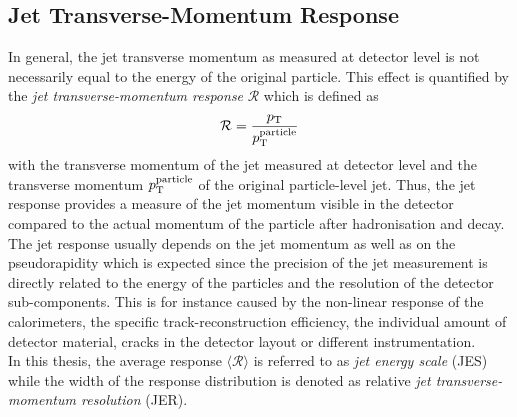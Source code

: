 \subsection{Jet Transverse-Momentum Response}
\label{subsec:jets_response}
In general, the jet transverse momentum as measured at detector level is not necessarily equal to the energy of the original particle. This effect is quantified by the \textit{jet transverse-momentum response} $\mathcal{R}$ which is defined as 
\begin{equation}
  \mathcal{R} = \frac{p_{\text{T}}}{p_{\text{T}}^{\mathrm{particle}}} 
  \label{eq:response}
 \end{equation}
with the transverse momentum \pt of the jet measured at detector level and the transverse momentum $p_{\text{T}}^{\rm{particle}}$ of the original particle-level jet. Thus, the jet response provides a measure of the jet momentum visible in the detector compared to the actual momentum of the particle after hadronisation and decay. \\
The jet response usually depends on the jet momentum as well as on the pseudorapidity which is expected since the precision of the jet measurement is directly related to the energy of the particles and the resolution of the detector sub-components. This is for instance caused by the non-linear response of the calorimeters, the specific track-reconstruction efficiency, the individual amount of detector material, cracks in the detector layout or different instrumentation. \\
In this thesis, the average response $\langle \mathcal{R} \rangle$ is referred to as \textit{jet energy scale} (JES) while the width of the response distribution is denoted as relative \textit{jet transverse-momentum resolution} (JER).
\ \\
